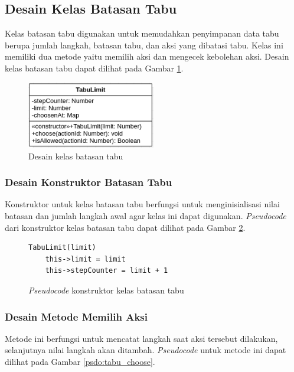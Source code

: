 \subsection{Desain Kelas Batasan Tabu}\label{desain_kelas_tabu}
Kelas batasan tabu digunakan untuk memudahkan penyimpanan data tabu berupa jumlah langkah, batasan tabu, dan aksi yang dibatasi tabu. Kelas ini memiliki dua metode yaitu memilih aksi dan mengecek kebolehan aksi. Desain kelas batasan tabu dapat dilihat pada Gambar \ref{fig:class_tabuLimit}.

\begin{figure}[ht]
	\centering\includegraphics[width=0.5\textwidth]{bab3/figures/class_tabuLimit.png}
	\caption{Desain kelas batasan tabu}
	\label{fig:class_tabuLimit}
\end{figure}

\subsubsection{Desain Konstruktor Batasan Tabu}
Konstruktor untuk kelas batasan tabu berfungsi untuk menginisialisasi nilai batasan dan jumlah langkah awal agar kelas ini dapat digunakan. \textit{Pseudocode} dari konstruktor kelas batasan tabu dapat dilihat pada Gambar \ref{psdo:tabu_constructor}.

\begin{figure}[ht]
	\begin{lstlisting}[firstnumber=0]
	TabuLimit(limit)
	this->limit = limit
	this->stepCounter = limit + 1
	\end{lstlisting}
	\caption{\textit{Pseudocode} konstruktor kelas batasan tabu}
	\label{psdo:tabu_constructor}
\end{figure}

\subsubsection{Desain Metode Memilih Aksi}
Metode ini berfungsi untuk mencatat langkah saat aksi tersebut dilakukan, selanjutnya nilai langkah akan ditambah. \textit{Pseudocode} untuk metode ini dapat dilihat pada Gambar \ref{psdo:tabu_choose}.

